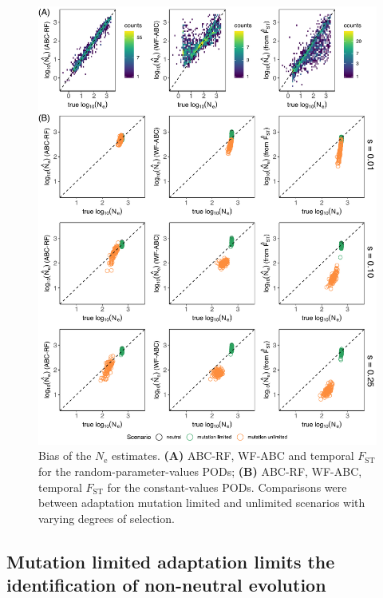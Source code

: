 \documentclass[a4paper, 12pt]{article}
\begin{document}
\begin{figure}[!htb]
  \centering
  \label{fig:fig5}
  \includegraphics[width=1\textwidth]{Figures/bias_ne_estimates_s_2.pdf}
  \captionsetup{font=footnotesize}
  \caption{Bias of the $N_{\mathrm{e}}$ estimates. \textbf{(A)} ABC-RF, WF-ABC and temporal $F_{\mathrm{ST}}$ for the random-parameter-values PODs; \textbf{(B)} ABC-RF, WF-ABC, temporal $F_{\mathrm{ST}}$ for the constant-values PODs. Comparisons were between adaptation mutation limited and unlimited scenarios with varying degrees of selection.}
\end{figure}

\subsection*{Mutation limited adaptation limits the identification of non-neutral evolution}
\end{document}

